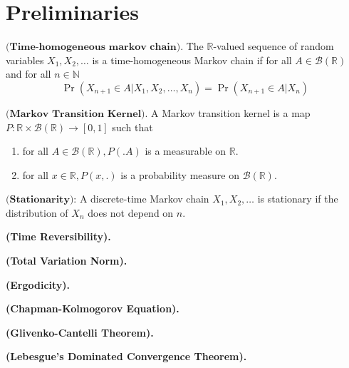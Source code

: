 \chapter{Preliminaries}
\begin{definition}
	$\textbf{(Time-homogeneous markov chain).}$ The $\mathbb{R}$-valued sequence of random variables $X_1, X_2, \dots$ is a time-homogeneous Markov chain if for all $A \in \mathcal{B}(\mathbb{R})$ and for all $n \in \mathbb{N}$
	$$\Pr(X_{n+1} \in A | X_1, X_2, \dots, X_n) = \Pr(X_{n+1} \in A | X_n)$$
\end{definition}
\begin{definition}
	$\textbf{(Markov Transition Kernel).}$ A Markov transition kernel is a map $P: \mathbb{R} \times \mathcal{B}(\mathbb{R}) \rightarrow [0, 1]$ such that
	\begin{enumerate}
		\item for all $A \in \mathcal{B}(\mathbb{R}), P(. A)$ is a measurable on $\mathbb{R}$.
		\item for all $x \in \mathbb{R}, P(x, .)$ is a probability measure on $\mathcal{B}(\mathbb{R})$.
	\end{enumerate}
\end{definition}
\begin{definition}
	$\textbf{(Stationarity):}$ A discrete-time Markov chain $X_1, X_2, \dots$ is stationary if the distribution of $X_n$ does not depend on $n$.
\end{definition}
\begin{definition}
	\textbf{(Time Reversibility).}
\end{definition}
\begin{definition}
	\textbf{(Total Variation Norm).}
\end{definition}
\begin{definition}
	\textbf{(Ergodicity).}
\end{definition}
\begin{definition}
	\textbf{(Chapman-Kolmogorov Equation).}
\end{definition}
\begin{definition}
	\textbf{(Glivenko-Cantelli Theorem).}
\end{definition}
\begin{theorem}
	\textbf{(Lebesgue's Dominated Convergence Theorem).}
\end{theorem}
